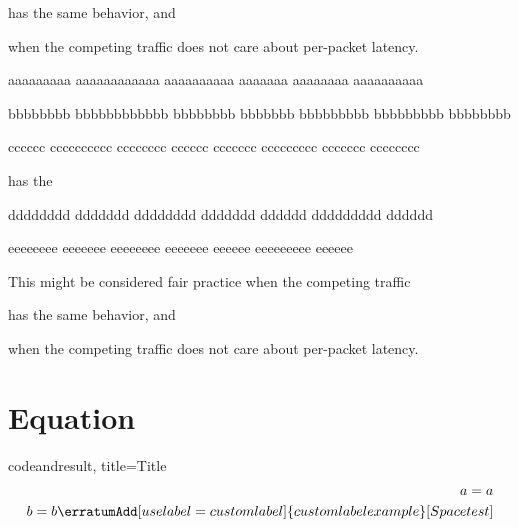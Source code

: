 \documentclass[a4paper,12pt]{report}
\begin{document}
\begin{inlinelist}
  \item{} has the  same behavior, and

  \item{} when the competing traffic does not care about per-packet latency.

  \item{} aaaaaaaaa aaaaaaaaaaaa aaaaaaaaaa aaaaaaa aaaaaaaa aaaaaaaaaa

  \item{} bbbbbbbb bbbbbbbbbbbb bbbbbbbb bbbbbbb bbbbbbbbb bbbbbbbbb bbbbbbbb

  \item{} cccccc cccccccccc cccccccc cccccc ccccccc ccccccccc ccccccc cccccccc

  \item{} has the 

  \item{} dddddddd ddddddd dddddddd ddddddd dddddd ddddddddd dddddd

  \item{} eeeeeeee eeeeeee eeeeeeee eeeeeee eeeeee eeeeeeeee eeeeee

\end{inlinelist}


This might be considered fair practice when the competing traffic
\begin{inlinelist}
  \item{} has the  same behavior, and

  \item{} when the competing traffic does not care about per-packet latency.
\end{inlinelist}



\section{Equation}\label{subsect-Equation}

\begin{examplecode}{codeandresult, title=Title}
\begin{equation}\label{customlabel}
\begin{split}
  a=a  \\
  b=b \erratumAdd[uselabel=customlabel]{custom label example}
  [Space test]
\end{split}
\end{equation}
\end{examplecode}
\end{document}
